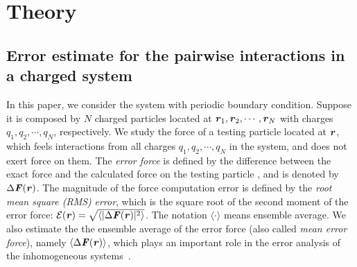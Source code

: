 \documentclass[aps,pre,preprint,unsortedaddress]{revtex4}
\renewcommand{\v}[1]{\textbf{\textit{#1}}}
\begin{document}



\section{Theory}

\subsection{Error estimate for
  the pairwise interactions in a charged system}

In this paper, we consider the system with periodic boundary condition.
Suppose it is
composed by $N$ charged particles located at $\v r_1, \v r_2, \cdots,
\v r_N$ with charges $q_1, q_2, \cdots, q_N$, respectively.
We study the force of a testing particle located at $\v r$, which
feels interactions from all charges $q_1, q_2, \cdots, q_N$
in the system, and does not
exert force on them.
The \emph{error force} is defined by the difference between
the exact force and the calculated
force on the testing particle
\cite{wang2012}, and is denoted by $\Delta \v F(\v r)$.
The magnitude of the force computation error 
is defined by the \emph{root mean square (RMS)} \emph{error}, which is
the square root of the second moment of the error force: $\mathcal
E(\v r) = \sqrt{\langle\vert\Delta\v F(\v r)\vert^2\rangle}$.  The
notation $\langle\cdot\rangle$ means ensemble average.  We also
estimate the the ensemble average of the error force (also called
\emph{mean error force}), namely $\langle\Delta\v F(\v r)\rangle$,
which plays an important role in the error analysis of the
inhomogeneous systems~\cite{wang2012}.
\end{document}
